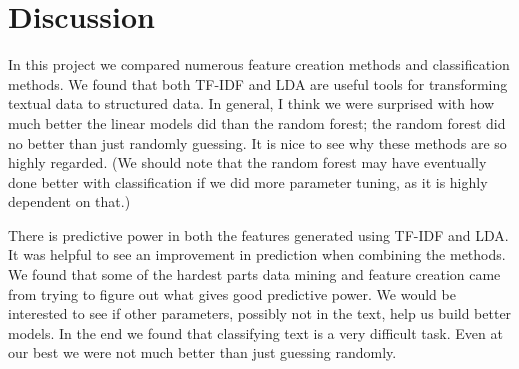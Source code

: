 \documentclass[11pt]{article}
\begin{document}
\section{Discussion}
\label{sec:discussion}

In this project we compared numerous feature creation methods and classification methods. We found that both TF-IDF and LDA are useful tools for transforming textual data to structured data. In general, I think we were surprised with how much better the linear models did than the random forest; the random forest did no better than just randomly guessing. It is nice to see why these methods are so highly regarded. (We should note that the random forest may have eventually done better with classification if we did more parameter tuning, as it is highly dependent on that.)

There is predictive power in both the features generated using TF-IDF and LDA. It was helpful to see an improvement in prediction when combining the methods. We found that some of the hardest parts data mining and feature creation came from trying to figure out what gives good predictive power. We would be interested to see if other parameters, possibly not in the text, help us build better models. In the end we found that classifying text is a very difficult task. Even at our best we were not much better than just guessing randomly.

{}

\end{document}
